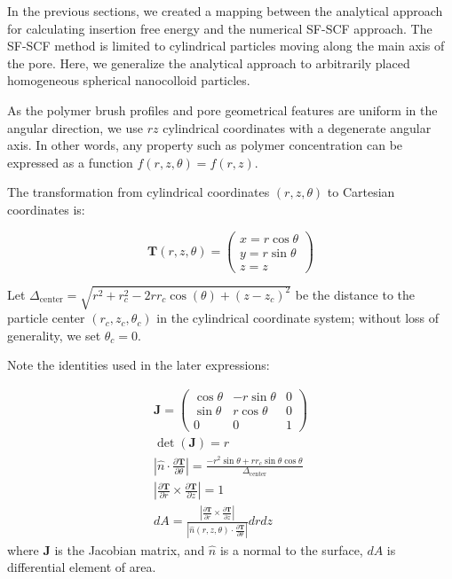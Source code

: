 \documentclass[10pt, a4paper]{article}
\begin{document}
\begin{multicols}{2}

In the previous sections, we created a mapping between the analytical approach for calculating insertion free energy and the numerical SF-SCF approach.
The SF-SCF method is limited to cylindrical particles moving along the main axis of the pore.
Here, we generalize the analytical approach to arbitrarily placed homogeneous spherical nanocolloid particles.

As the polymer brush profiles and pore geometrical features are uniform in the angular direction, we use $rz$ cylindrical coordinates with a degenerate angular axis.
In other words, any property such as polymer concentration can be expressed as a function $f(r, z, \theta) = f(r, z)$.

The transformation from cylindrical coordinates $(r, z, \theta)$ to Cartesian coordinates is:

\begin{equation}
    \bm{T}(r, z, \theta) = 
    \begin{pmatrix}
        x = r \cos \theta\\
        y = r \sin \theta\\
        z = z
    \end{pmatrix}
\end{equation}

Let $\Delta_{\text{center}} = \sqrt{r^2 + r_c^2 - 2 r r_c \cos(\theta) + (z - z_c)^2}$ be the distance to the particle center $(r_c, z_c, \theta_c)$ in the cylindrical coordinate system; without loss of generality, we set $\theta_c = 0$.

Note the identities used in the later expressions:

\begin{gather}
    \bm{J} = 
    \begin{pmatrix}
        \cos{\theta} & -r\sin\theta & 0 \\
        \sin{\theta} &  r\cos\theta & 0 \\
        0           & 0            & 1
    \end{pmatrix}\\
    \det(\bm{J}) = r \\
    \left| \hat{n} \cdot \frac{\partial \bm{T}}{\partial \theta} \right| = \frac{-r^2 \sin \theta + r r_c \sin \theta \cos \theta}{\Delta_{\text{center}}}\\
    \left| \frac{\partial \bm{T}}{\partial r} \times \frac{\partial \bm{T}}{\partial z} \right| = 1\\
    dA = \frac{\left|\frac{\partial \bm{T}}{\partial r} \times \frac{\partial \bm{T}}{\partial z} \right|}{\left|\hat{n}(r, z, \theta) \cdot \frac{\partial\bm{T}}{\partial \theta}\right|} dr dz
\end{gather}
where $\bm{J}$ is the Jacobian matrix, and $\hat{n}$ is a normal to the surface, $dA$ is differential element of area.


\end{multicols}
\end{document}
